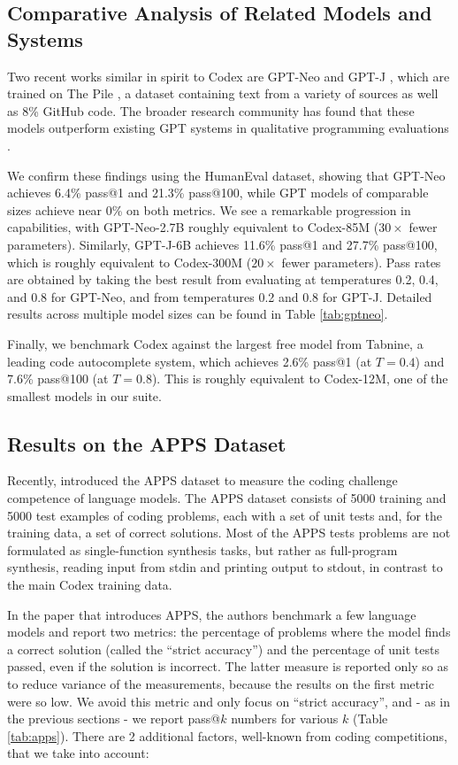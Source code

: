 \subsection{Comparative Analysis of Related Models and Systems}
\label{sec:ft:comparison}

Two recent works similar in spirit to Codex are GPT-Neo \cite{gpt-neo} and GPT-J \cite{gpt-j}, which are trained on The Pile \cite {gao2020pile}, a dataset containing text from a variety of sources as well as 8\% GitHub code. The broader research community has found that these models outperform existing GPT systems in qualitative programming evaluations \cite{woolf2021fun}.

We confirm these findings using the HumanEval dataset, showing that GPT-Neo achieves 6.4\% pass@1 and 21.3\% pass@100, while GPT models of comparable sizes achieve near 0\% on both metrics. We see a remarkable progression in capabilities, with GPT-Neo-2.7B roughly equivalent to Codex-85M ($30 \times$ fewer parameters). Similarly, GPT-J-6B achieves 11.6\% pass@1 and 27.7\% pass@100, which is roughly equivalent to Codex-300M ($20 \times$ fewer parameters). Pass rates are obtained by taking the best result from evaluating at temperatures 0.2, 0.4, and 0.8 for GPT-Neo, and from temperatures 0.2 and 0.8 for GPT-J. Detailed results across multiple model sizes can be found in Table \ref{tab:gptneo}.

Finally, we benchmark Codex against the largest free model from Tabnine, a leading code autocomplete system, which achieves 2.6\% pass@1 (at $T=0.4$) and 7.6\% pass@100 (at $T=0.8$). This is roughly equivalent to Codex-12M, one of the smallest models in our suite.

\subsection{Results on the APPS Dataset}
\label{sec:ft:apps}

Recently, \citet{hendrycks2021apps} introduced the APPS dataset to measure the coding challenge competence of language models. The APPS dataset consists of 5000 training and 5000 test examples of coding problems, each with a set of unit tests and, for the training data, a set of correct solutions. Most of the APPS tests problems are not formulated as single-function synthesis tasks, but rather as full-program synthesis, reading input from stdin and printing output to stdout, in contrast to the main Codex training data.

In the paper that introduces APPS, the authors benchmark a few language models and report two metrics: the percentage of problems where the model finds a correct solution (called the ``strict accuracy'') and the percentage of unit tests passed, even if the solution is incorrect. The latter measure is reported only so as to reduce variance of the measurements, because the results on the first metric were so low. We avoid this metric and only focus on ``strict accuracy'', and - as in the previous sections - we report pass@$k$ numbers for various $k$ (Table \ref{tab:apps}). There are 2 additional factors, well-known from coding competitions, that we take into account:


